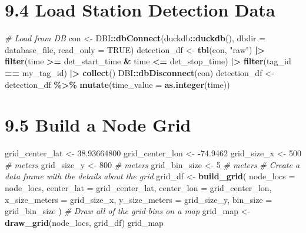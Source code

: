 \documentclass[
]{book}
\newenvironment{Shaded}{\begin{snugshade}}{\end{snugshade}}
\newcommand{\AttributeTok}[1]{\textcolor[rgb]{0.13,0.29,0.53}{#1}}
\newcommand{\CommentTok}[1]{\textcolor[rgb]{0.56,0.35,0.01}{\textit{#1}}}
\newcommand{\ConstantTok}[1]{\textcolor[rgb]{0.56,0.35,0.01}{#1}}
\newcommand{\DecValTok}[1]{\textcolor[rgb]{0.00,0.00,0.81}{#1}}
\newcommand{\FloatTok}[1]{\textcolor[rgb]{0.00,0.00,0.81}{#1}}
\newcommand{\FunctionTok}[1]{\textcolor[rgb]{0.13,0.29,0.53}{\textbf{#1}}}
\newcommand{\NormalTok}[1]{#1}
\newcommand{\OtherTok}[1]{\textcolor[rgb]{0.56,0.35,0.01}{#1}}
\newcommand{\SpecialCharTok}[1]{\textcolor[rgb]{0.81,0.36,0.00}{\textbf{#1}}}
\newcommand{\StringTok}[1]{\textcolor[rgb]{0.31,0.60,0.02}{#1}}
\begin{document}
\section{9.4 Load Station Detection Data}\label{load-station-detection-data-1}

\begin{Shaded}
\begin{Highlighting}[]
\CommentTok{\# Load from DB}
\NormalTok{con }\OtherTok{\textless{}{-}}\NormalTok{ DBI}\SpecialCharTok{::}\FunctionTok{dbConnect}\NormalTok{(duckdb}\SpecialCharTok{::}\FunctionTok{duckdb}\NormalTok{(), }\AttributeTok{dbdir =}\NormalTok{ database\_file, }\AttributeTok{read\_only =} \ConstantTok{TRUE}\NormalTok{)}
\NormalTok{detection\_df }\OtherTok{\textless{}{-}} \FunctionTok{tbl}\NormalTok{(con, }\StringTok{"raw"}\NormalTok{) }\SpecialCharTok{|\textgreater{}}
  \FunctionTok{filter}\NormalTok{(time }\SpecialCharTok{\textgreater{}=}\NormalTok{ det\_start\_time }\SpecialCharTok{\&}\NormalTok{ time }\SpecialCharTok{\textless{}=}\NormalTok{ det\_stop\_time) }\SpecialCharTok{|\textgreater{}}
  \FunctionTok{filter}\NormalTok{(tag\_id }\SpecialCharTok{==}\NormalTok{ my\_tag\_id) }\SpecialCharTok{|\textgreater{}}
  \FunctionTok{collect}\NormalTok{()}
\NormalTok{DBI}\SpecialCharTok{::}\FunctionTok{dbDisconnect}\NormalTok{(con)}
\NormalTok{detection\_df }\OtherTok{\textless{}{-}}\NormalTok{ detection\_df }\SpecialCharTok{\%\textgreater{}\%} \FunctionTok{mutate}\NormalTok{(}\AttributeTok{time\_value =} \FunctionTok{as.integer}\NormalTok{(time))}
\end{Highlighting}
\end{Shaded}

\section{9.5 Build a Node Grid}\label{build-a-node-grid}

\begin{Shaded}
\begin{Highlighting}[]
\NormalTok{grid\_center\_lat }\OtherTok{\textless{}{-}} \FloatTok{38.93664800}
\NormalTok{grid\_center\_lon }\OtherTok{\textless{}{-}} \SpecialCharTok{{-}}\FloatTok{74.9462}
\NormalTok{grid\_size\_x }\OtherTok{\textless{}{-}} \DecValTok{500} \CommentTok{\# meters}
\NormalTok{grid\_size\_y }\OtherTok{\textless{}{-}} \DecValTok{800} \CommentTok{\# meters}
\NormalTok{grid\_bin\_size }\OtherTok{\textless{}{-}} \DecValTok{5} \CommentTok{\# meters}
\CommentTok{\# Create a data frame with the details about the grid}
\NormalTok{grid\_df }\OtherTok{\textless{}{-}} \FunctionTok{build\_grid}\NormalTok{(}
  \AttributeTok{node\_locs =}\NormalTok{ node\_locs,}
  \AttributeTok{center\_lat =}\NormalTok{ grid\_center\_lat,}
  \AttributeTok{center\_lon =}\NormalTok{ grid\_center\_lon,}
  \AttributeTok{x\_size\_meters =}\NormalTok{ grid\_size\_x,}
  \AttributeTok{y\_size\_meters =}\NormalTok{ grid\_size\_y,}
  \AttributeTok{bin\_size =}\NormalTok{ grid\_bin\_size}
\NormalTok{)}
\CommentTok{\# Draw all of the grid bins on a map}
\NormalTok{grid\_map }\OtherTok{\textless{}{-}} \FunctionTok{draw\_grid}\NormalTok{(node\_locs, grid\_df)}
\NormalTok{grid\_map}
\end{Highlighting}
\end{Shaded}
\end{document}
